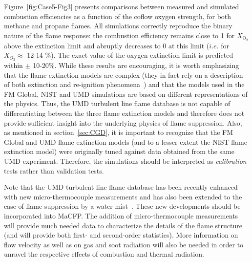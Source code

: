 Figure~\ref{fig:Case5-Fig3} presents comparisons between measured and simulated combustion efficiencies as a function of the coflow oxygen strength,  for both methane and propane flames. All simulations correctly reproduce the binary nature of the flame response: the combustion efficiency remains close to 1 for $X_{\text{O}_2}$ above the extinction limit and abruptly decreases to 0 at this limit ($i.e.$ for $X_{O_2} \approx$ 12-14 \%). The exact value of the oxygen extinction limit is predicted within $\pm$ 10-20\%. While these results are encouraging, it is worth emphasizing that the flame extinction models are complex (they in fact rely on a description of both extinction and re-ignition phenomena~\cite{Dorofeev:2016,Vilfayeau:2016,White:2017}) and that the models used in the FM Global, NIST and UMD simulations are based on different representations of the physics. Thus, the UMD turbulent line flame database is not capable of differentiating between the three flame extinction models and therefore does not provide sufficient insight into the underlying physics of flame suppression. Also, as mentioned in section~\ref{sec:CGD}, it is important to recognize that the FM Global and UMD flame extinction models (and to a lesser extent the NIST flame extinction model) were originally tuned against data obtained from the same UMD experiment. Therefore, the simulations should be interpreted as \emph{calibration} tests rather than validation tests.

Note that the UMD turbulent line flame database has been recently enhanced with new micro-thermocouple measurements and has also been extended to the case of flame suppression by a water mist~\cite{Case5_EXP_1}. These new developments should be incorporated into MaCFP. The addition of micro-thermocouple measurements will provide much needed data to characterize the details of the flame structure (and will provide both first- and second-order statistics). More information on flow velocity as well as on gas and soot radiation will also be needed in order to unravel the respective effects of combustion and thermal radiation.











